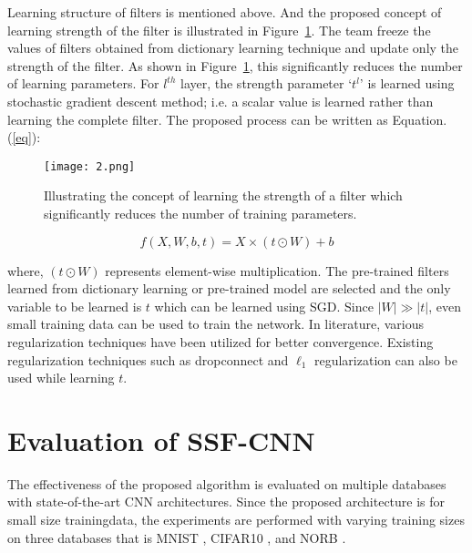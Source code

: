 \documentclass[twocolumn]{article}
\begin{document}
   Learning structure of filters is mentioned above. And the proposed concept of learning strength of the filter is illustrated in Figure~\ref{strength}. The team freeze the values of filters obtained from dictionary learning technique and update only the strength of the filter. As shown in Figure~\ref{strength}, this significantly reduces the number of learning parameters. For $l^{th}$ layer, the strength parameter `$t^l$' is learned using stochastic gradient descent method; i.e. a scalar value is learned rather than learning the complete filter. The proposed process can be written as Equation. (\ref{eq}):
   
   \begin{figure}[ht]
   	\centering
   	\texttt{[image: 2.png]}
   	\caption{Illustrating the concept of learning the strength of a filter
   		which significantly reduces the number of training parameters.}\label{strength}
   \end{figure}

	\begin{equation}
	f(X,W,b,t) = X \times (t\odot W) +b \label{eq}
	\end{equation}
	
   where, $\left( t\odot W \right) $ represents element-wise multiplication. The pre-trained filters learned from dictionary learning or pre-trained model are selected and the only variable to be learned is $t$ which can be learned using SGD. Since $\left| W\right| \gg \left| t \right| $, even small training data can be used to train the network. In literature, various regularization techniques have been utilized for better convergence. Existing regularization techniques such as dropconnect and $\ell_1$ regularization can also be used while learning $t$.
    
    \section{Evaluation of SSF-CNN}
    The effectiveness of the proposed algorithm is evaluated on multiple databases with state-of-the-art CNN architectures. Since the proposed architecture is for small size trainingdata, the experiments are performed with varying training sizes on three databases that is MNIST \cite{Haykin2009GradientBased}, CIFAR10 \cite{Krizhevsky2009Learning}, and NORB \cite{Lecun2004Learning}.
\end{document}
